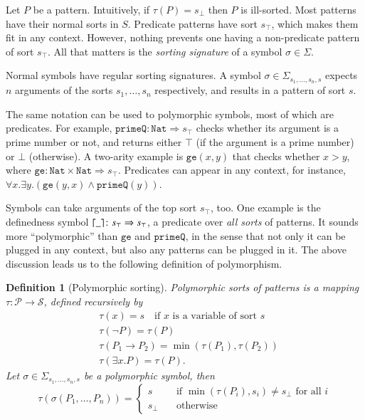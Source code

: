 \documentclass{article}
\theoremstyle{plain}
\newtheorem{defn}[thm]{Definition}
\DeclarePairedDelimiter\ceil{\lceil}{\rceil}
\begin{document}
Let $P$ be a pattern. Intuitively, if $\tau(P) = s_\bot$ then $P$ is ill-sorted. Most patterns have their normal sorts in $S$. Predicate patterns have sort $s_\top$, which makes them fit in any context. However, nothing prevents one having a non-predicate pattern of sort $s_\top$. All that matters is the \emph{sorting signature} of a symbol $\sigma \in \Sigma$.

Normal symbols have regular sorting signatures. A symbol $\sigma \in \Sigma_{s_1,\dots,s_n, s}$ expects $n$ arguments of the sorts $s_1, \dots, s_n$ respectively, and results in a pattern of sort $s$. 

The same notation can be used to polymorphic symbols, most of which are predicates. For example, $\mathtt{primeQ} \colon \mathtt{Nat} \Rightarrow s_\top$ checks whether its argument is a prime number or not, and returns either $\top$ (if the argument is a prime number) or $\bot$ (otherwise). A two-arity example is $\mathtt{ge}(x,y)$ that checks whether $x > y$, where $\mathtt{ge} \colon \mathtt{Nat} \times \mathtt{Nat} \Rightarrow s_\top$. Predicates can appear in any context, for instance, $\forall x . \exists y . (\mathtt{ge}(y, x) \wedge \mathtt{primeQ}(y))$.

Symbols can take arguments of the top sort $s_\top$, too. One example is the definedness symbol $\ceil*{\_} \colon s_\top \Rightarrow s_\top$, a predicate over \emph{all sorts} of patterns. It sounds more ``polymorphic'' than $\mathtt{ge}$ and $\mathtt{primeQ}$, in the sense that not only it can be plugged in any context, but also any patterns can be plugged in it. The above discussion leads us to the following definition of polymorphism.

\begin{defn}[Polymorphic sorting]
	Polymorphic sorts of patterns is a mapping $\tau \colon \mathcal{P} \to \mathcal{S}$, defined recursively by
\begin{align*}
  &\tau(x) = s \quad \text{if $x$ is a variable of sort $s$} \\
  &\tau(\neg P) = \tau(P) \\
  &\tau(P_1 \to P_2) = \min(\tau(P_1), \tau(P_2)) \\
  &\tau(\exists x . P) = \tau(P).
\end{align*}
Let $\sigma \in \Sigma_{s_1,\dots,s_n,s}$ be a polymorphic symbol, then
\begin{equation*}
\tau(\sigma(P_1,\dots,P_n)) =
\begin{cases}
s \quad &\text{if \ $\min(\tau(P_i), s_i) \neq s_\bot$ \ for all $i$} \\
s_\bot \quad &\text{otherwise}
\end{cases}
\end{equation*}
\end{defn}
\end{document}
